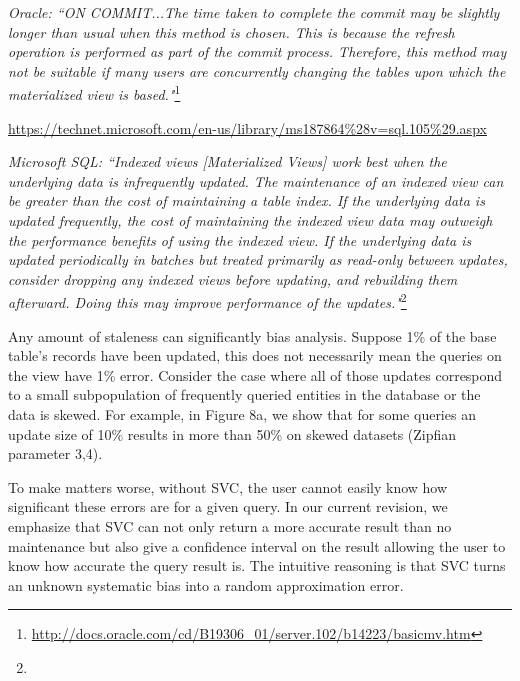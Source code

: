 \vspace{0.5em}

\emph{Oracle: ``ON COMMIT...The time taken to complete the commit may be slightly longer than usual when this method is chosen. This is because the refresh operation is performed as part of the commit process. Therefore, this method may not be suitable if many users are concurrently changing the tables upon which the materialized view is based."}\footnote{\url{http://docs.oracle.com/cd/B19306_01/server.102/b14223/basicmv.htm}}


\vspace{0.5em}

\urldef{\microsoft}\url{https://technet.microsoft.com/en-us/library/ms187864%28v=sql.105%29.aspx}

\emph{Microsoft SQL: ``Indexed views [Materialized Views] work best when the underlying data is infrequently updated. The maintenance of an indexed view can be greater than the cost of maintaining a table index. If the underlying data is updated frequently, the cost of maintaining the indexed view data may outweigh the performance benefits of using the indexed view. If the underlying data is updated periodically in batches but treated primarily as read-only between updates, consider dropping any indexed views before updating, and rebuilding them afterward. Doing this may improve performance of the updates."}\footnote{\microsoft}

\vspace{0.5em}

Any amount of staleness can significantly bias analysis. Suppose 1\% of the base table's records have been updated, this does not necessarily mean the queries on the view have 1\% error.  Consider the case where all of those updates correspond to a small subpopulation of frequently queried entities in the database or the data is skewed. For example, in Figure 8a, we show that for some queries an update size of 10\% results in more than 50\% on  skewed datasets (Zipfian parameter 3,4).

To make matters worse, without SVC, the user cannot easily know how significant these errors are for a given query. 
In our current revision, we emphasize that 
SVC can not only return a more accurate result than no maintenance but also give a confidence interval on the result allowing the user to know how accurate the query result is. The intuitive reasoning is that SVC turns an unknown systematic bias into a random approximation error.

